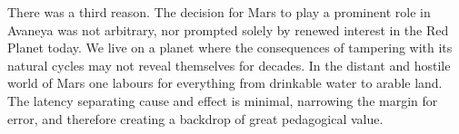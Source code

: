 There was a third reason. The decision for Mars to play a prominent role in Avaneya was not arbitrary, nor prompted solely by renewed interest in the Red Planet today. We live on a planet where the consequences of tampering with its natural cycles may not reveal themselves for decades. In the distant and hostile world of Mars one labours for everything from drinkable water to arable land. The latency separating cause and effect is minimal, narrowing the margin for error, and therefore creating a backdrop of great pedagogical value.

\StopChapter

